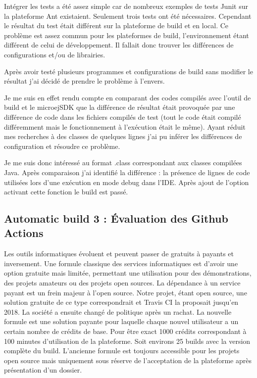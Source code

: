 \documentclass[french,a4paper,12pt]{report}
\begin{document}
Intégrer les tests a été assez simple car de nombreux exemples de tests Junit sur la plateforme Ant existaient. Seulement trois tests ont été nécessaires. Cependant le résultat du test était différent sur la plateforme de build et en local. Ce problème est assez commun pour les plateformes de build, l’environnement étant différent de celui de développement. Il fallait donc trouver les différences de configurations et/ou de librairies.

Après avoir testé plusieurs programmes et configurations de build sans modifier le résultat j’ai décidé de prendre le problème à l’envers.

Je me suis en effet rendu compte en comparant des codes compilés avec l’outil de build et le microejSDK que la différence de résultat était provoquée par une différence de code dans les fichiers compilés de test (tout le code était compilé différemment mais le fonctionnement à l’exécution était le même). Ayant réduit mes recherches à des classes de quelques lignes j’ai pu inférer les différences de configuration et résoudre ce problème.

Je me suis donc intéressé au format .class correspondant aux classes compilées Java. 
Après comparaison j’ai identifié la différence : la présence de lignes de code utilisées lors d'une exécution en mode debug dans l’IDE. Après ajout de l’option activant cette fonction le build est passé.

\subsection{Automatic build 3 : Évaluation des Github Actions}

Les outils informatiques évoluent et peuvent passer de gratuits à payants et inversement. Une formule classique des services informatiques est d’avoir une option gratuite mais limitée, permettant une utilisation pour des démonstrations, des projets amateurs ou des projets open sources. La dépendance à un service payant est un frein majeur à l’open source. Notre projet, étant open source, une solution gratuite de ce type correspondrait et Travis CI la proposait jusqu’en 2018. La société a ensuite changé de politique après un rachat. La nouvelle formule est une solution payante pour laquelle chaque nouvel utilisateur a un certain nombre de crédits de base. Pour être exact 1000 crédits correspondant à 100 minutes d’utilisation de la plateforme. Soit environs 25 builds avec la version complète du build. L'ancienne formule est toujours accessible pour les projets open source mais uniquement sous réserve de l'acceptation de la plateforme après présentation d'un dossier.
\end{document}
